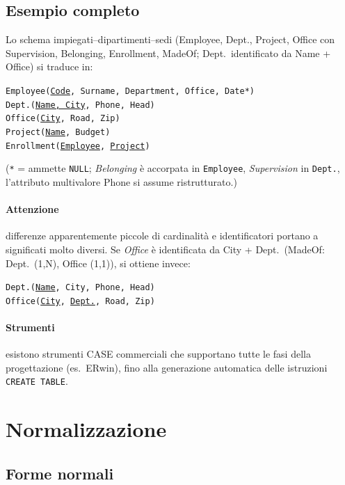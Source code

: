 \documentclass[a4paper,12pt]{article}
\begin{document}
\subsection{Esempio completo}

Lo schema impiegati--dipartimenti--sedi (Employee, Dept., Project, Office con
Supervision, Belonging, Enrollment, MadeOf; Dept.\ identificato da Name +
Office) si traduce in:
\begin{center}
\texttt{Employee(\underline{Code}, Surname, Department, Office, Date*)}\\
\texttt{Dept.(\underline{Name, City}, Phone, Head)}\\
\texttt{Office(\underline{City}, Road, Zip)}\\
\texttt{Project(\underline{Name}, Budget)}\\
\texttt{Enrollment(\underline{Employee}, \underline{Project})}
\end{center}
(\texttt{*} = ammette \texttt{NULL}; \emph{Belonging} è accorpata in
\texttt{Employee}, \emph{Supervision} in \texttt{Dept.}, l'attributo
multivalore Phone si assume ristrutturato.)

\paragraph{Attenzione} differenze apparentemente piccole di cardinalità e
identificatori portano a significati molto diversi. Se \emph{Office} è
identificata da City + Dept.\ (MadeOf: Dept.\ (1,N), Office (1,1)), si ottiene
invece:
\begin{center}
\texttt{Dept.(\underline{Name}, City, Phone, Head)}\\
\texttt{Office(\underline{City}, \underline{Dept.}, Road, Zip)}
\end{center}

\paragraph{Strumenti} esistono strumenti CASE commerciali che supportano tutte
le fasi della progettazione (es.\ ERwin), fino alla generazione automatica
delle istruzioni \texttt{CREATE TABLE}.

\section{Normalizzazione}

\subsection{Forme normali}
\end{document}
